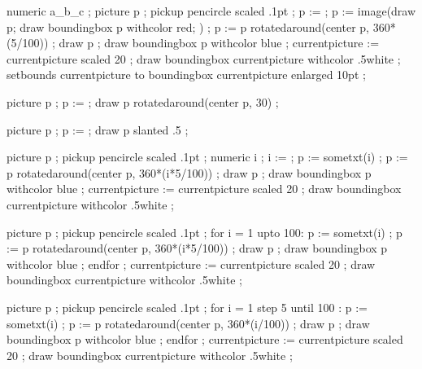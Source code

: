
\startMPpage
    numeric a_b_c ;
    picture p ; pickup pencircle scaled .1pt ;
    p :=  ;
    p := image(draw p; draw boundingbox p withcolor red; ) ;
    p := p rotatedaround(center p,  360*(5/100)) ;
    draw p ; draw boundingbox p withcolor blue ;
    currentpicture := currentpicture scaled 20 ;
    draw boundingbox currentpicture  withcolor .5white ;
    setbounds currentpicture to boundingbox currentpicture enlarged 10pt ;
\stopMPpage

\startMPpage
    picture p ;
    p := \sometxt{\framed[width=fit,align=middle]{\relax}} ;
    draw p rotatedaround(center p, 30) ;
\stopMPpage

\startMPpage
    picture p ;
    p := \sometxt{\framed[width=fit,align=middle]{\relax}} ;
    draw p slanted .5 ;
\stopMPpage

 {
    \startTeXtexts
    \stopTeXtexts
    \startMPpage
        picture p ; pickup pencircle scaled .1pt ;
        numeric i ; i := \recurselevel ;
        p := sometxt(i) ;
        p := p rotatedaround(center p,  360*(i*5/100)) ;
        draw p ; draw boundingbox p withcolor blue ;
        currentpicture := currentpicture scaled 20 ;
        draw boundingbox currentpicture  withcolor .5white ;
    \stopMPpage
}

\startTeXtexts
\stopTeXtexts

\startMPpage
    picture p ; pickup pencircle scaled .1pt ;
    for i = 1 upto 100:
        p := sometxt(i) ;
        p := p rotatedaround(center p,  360*(i*5/100)) ;
        draw p ; draw boundingbox p withcolor blue ;
    endfor ;
    currentpicture := currentpicture scaled 20 ;
    draw boundingbox currentpicture  withcolor .5white ;
\stopMPpage

\startTeXtexts
\stopTeXtexts

\startMPpage
    picture p ; pickup pencircle scaled .1pt ;
    for i = 1 step 5 until 100 :
        p := sometxt(i) ;
        p := p rotatedaround(center p,  360*(i/100)) ;
        draw p ; draw boundingbox p withcolor blue ;
    endfor ;
    currentpicture := currentpicture scaled 20 ;
    draw boundingbox currentpicture  withcolor .5white ;
\stopMPpage

